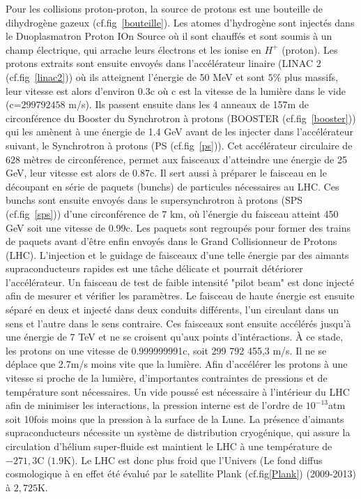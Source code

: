 Pour les collisions proton-proton, la source de protons est une bouteille de dihydrogène gazeux (cf.fig~\ref{bouteille}). Les atomes d’hydrogène sont injectés dans le Duoplasmatron Proton IOn Source où il sont chauffés et sont soumis à un champ électrique, qui arrache leurs électrons et les ionise en $H^{+}$ (proton). Les protons extraits sont ensuite envoyés dans l'accélérateur linaire (LINAC 2 (cf.fig~\ref{linac2})) où ils atteignent l'énergie de 50 MeV et sont $5\%$ plus massifs, leur vitesse est alors d'environ $0.3$c où c est la vitesse de la lumière dans le vide (c=$299 792 458$ m/s). Ils passent ensuite dans les 4 anneaux de 157m de circonférence du Booster du Synchrotron à protons (BOOSTER (cf.fig~\ref{booster})) qui les amènent à une énergie de 1.4 GeV avant de les injecter dans l'accélérateur suivant, le Synchrotron à protons (PS (cf.fig~\ref{ps})). Cet accélérateur circulaire de 628 mètres de circonférence, permet aux faisceaux d'atteindre une énergie de 25 GeV, leur vitesse est alors de 0.87c. Il sert aussi à préparer le faisceau en le découpant en série de paquets (bunchs) de particules nécessaires au LHC. Ces bunchs sont ensuite envoyés dans le supersynchrotron à protons (SPS (cf.fig~\ref{sps})) d'une circonférence de 7 km, où l'énergie du faisceau atteint 450 GeV soit une vitesse de 0.99c. Les paquets sont regroupés pour former des trains de paquets avant d'être enfin envoyés dans le Grand Collisionneur de Protons (LHC). L'injection et le guidage de faisceaux d'une telle énergie par des aimants supraconducteurs rapides est une tâche délicate et pourrait détériorer l'accélérateur. Un faisceau de test de faible intensité "pilot beam" est donc injecté afin de mesurer et vérifier les paramètres. Le faisceau de haute énergie est ensuite séparé en deux et injecté dans deux conduits différents, l'un circulant dans un sens et l'autre dans le sens contraire. Ces faisceaux sont ensuite accélérés jusqu'à une énergie de 7 TeV et ne se croisent qu'aux points d'intéractions. À ce stade, les protons on une vitesse de 0.999999991c, soit 299 792 455,3 m/s. Il ne se déplace que 2.7m/s moins vite que la lumière. Afin d'accélérer les protons à une vitesse si proche de la lumière, d'importantes contraintes de pressions et de température sont nécessaires. Un vide poussé est nécessaire à l'intérieur du LHC afin de minimiser les interactions, la pression interne est de l'ordre de $10^{-13}$atm soit 10fois moins que la pression à la surface de la Lune. La présence d'aimants supraconducteurs nécessite un système de distribution cryogénique, qui assure la circulation d'hélium super-fluide est maintient le LHC à une température de $-271,3$\degre C ($1.9$K). Le LHC est donc plus froid que l'Univers (Le fond diffus cosmologique à en effet été évalué par le satellite Plank (cf.fig\ref{Plank}) (2009-2013) à $2,725$K.

